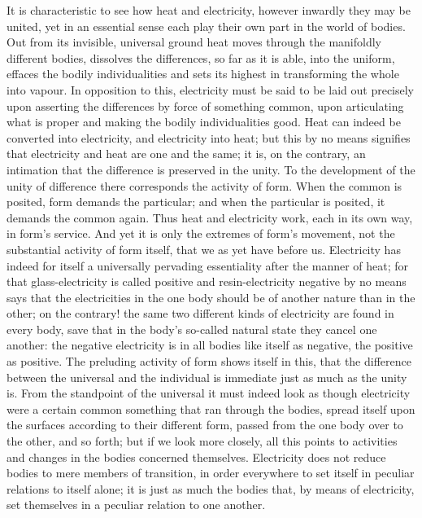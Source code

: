 \documentclass[12pt,a4paper]{book}
\begin{document}
It is characteristic to see how heat and electricity, however inwardly they may be united, yet in an essential sense each
play their own part in the world of bodies. Out from its invisible, universal ground heat moves through the manifoldly
different bodies, dissolves the differences, so far as it is able, into the uniform, effaces the bodily individualities
and sets its highest in transforming the whole into vapour. In opposition to this, electricity must be said to be laid
out precisely upon asserting the differences by force of something common, upon articulating what is proper
and making the bodily individualities good. Heat can indeed be converted into electricity, and electricity into heat; but
this by no means signifies that electricity and heat are one and the same; it is, on the contrary, an intimation that the
difference is preserved in the unity. To the development of the unity of difference there corresponds the activity of
form. When the common is posited, form demands the particular; and when the particular is posited, it demands the common
again. Thus heat and electricity work, each in its own way, in form's service. And yet it is only the extremes of form's
movement, not the substantial activity of form itself, that we as yet have before us. Electricity has indeed for itself a
universally pervading essentiality after the manner of heat; for that glass-electricity is called positive and
resin-electricity negative by no means says that the electricities in the one body should be of another nature than in
the other; on the contrary! the same two different kinds of electricity are found in every body, save that in the body's
so-called natural state they cancel one another: the negative electricity is in all bodies like itself as negative, the
positive as positive. The preluding activity of form shows itself in this, that the difference between the universal and
the individual is immediate just as much as the unity is. From the standpoint of the universal it must indeed look as
though electricity were a certain common something that ran through the bodies, spread itself upon the surfaces according
to their different form, passed from the one body over to the other, and so forth; but if we look more closely, all this
points to activities and changes in the bodies concerned themselves. Electricity does not reduce bodies to mere members of
transition, in order everywhere to set itself in peculiar relations to itself alone; it is just as much the bodies that,
by means of electricity, set themselves in a peculiar relation to one another.
\end{document}
